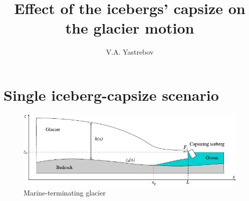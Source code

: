 \documentclass[a4paper,11pt]{article}
\title{Effect of the icebergs' capsize on the glacier motion}
\author{V.A. Yastrebov}
\begin{document}
\maketitle


\section{Single iceberg-capsize scenario}

\begin{figure}[htb!]
 \includegraphics[width=1\textwidth]{setup_glacier}
 \caption{\label{fig:1}Marine-terminating glacier}
\end{figure}
\end{document}
